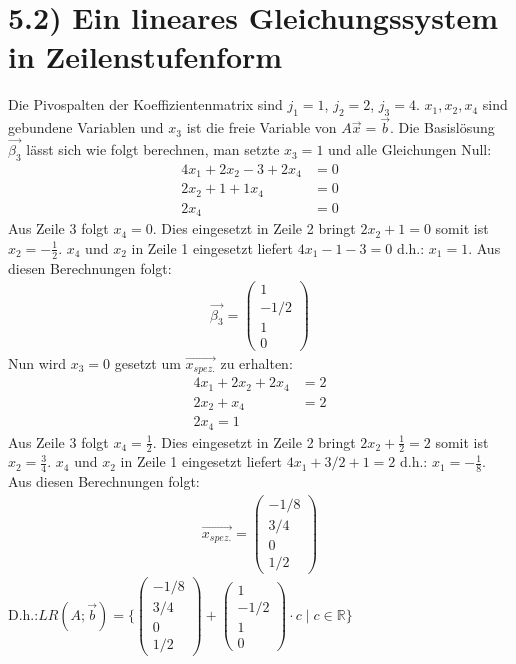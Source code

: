 \documentclass[titlepage]{article}
\begin{document}
	\section*{5.2) Ein lineares Gleichungssystem in Zeilenstufenform}
		Die Pivospalten der Koeffizientenmatrix sind $j_1=1$, $j_2=2$, $j_3=4$. $x_1,x_2,x_4$ sind gebundene Variablen und $x_3$ ist die freie Variable von $A\vec{x}=\vec{b}$. Die Basislösung $\vec{\beta_3}$ lässt sich wie folgt berechnen, man setzte $x_3=1$ und alle Gleichungen Null:
		\begin{align*}
			4x_1+2x_2-3+2x_4&=0\\
			2x_2+1+1x_4&=0\\
			2x_4&=0
		\end{align*}
	Aus Zeile 3 folgt $x_4=0$. Dies eingesetzt in Zeile 2 bringt $2x_2+1=0$ somit ist $x_2=-\frac{1}{2}$. $x_4$ und $x_2$ in Zeile 1 eingesetzt liefert $4x_1-1-3=0$ d.h.: $x_1=1$. Aus diesen Berechnungen folgt:
	\begin{align*}
		\vec{\beta_3}=\left(\begin{matrix}1\\-1/2\\1\\0\end{matrix}\right)
	\end{align*}
	Nun wird $x_3=0$ gesetzt um $\vec{x_{spez.}}$ zu erhalten:
	\begin{align*}
		4x_1+2x_2+2x_4&=2\\
		2x_2+x_4&=2\\
		2x_4=1
	\end{align*}
	Aus Zeile 3 folgt $x_4=\frac{1}{2}$. Dies eingesetzt in Zeile 2 bringt $2x_2+\frac{1}{2}=2$ somit ist $x_2=\frac{3}{4}$. $x_4$ und $x_2$ in Zeile 1 eingesetzt liefert $4x_1+3/2+1=2$ d.h.: $x_1=-\frac{1}{8}$. Aus diesen Berechnungen folgt:
	\begin{align*}
		\vec{x_{spez.}}=\left(\begin{matrix}-1/8\\3/4\\0\\1/2\end{matrix}\right)
	\end{align*}
	D.h.:\quad\quad  $LR(A;\vec{b})=\{\left(\begin{matrix}-1/8\\3/4\\0\\1/2\end{matrix}\right)+\left(\begin{matrix}1\\-1/2\\1\\0\end{matrix}\right)\cdot c\mid c\in\mathbb{R}\}$
\end{document}
